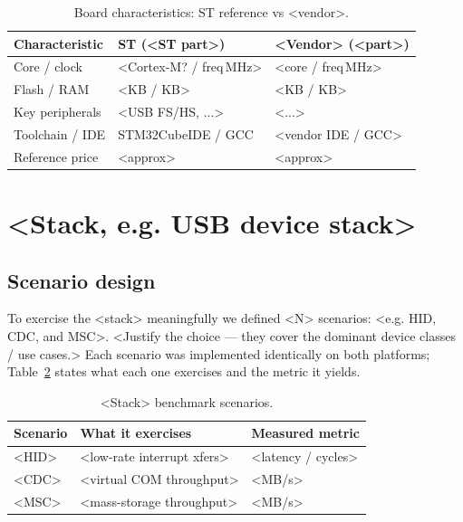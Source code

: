 \begin{table}[H]
  \centering
  \begin{tabular}{l l l}
    \toprule
    Characteristic   & ST (<ST part>)            & <Vendor> (<part>) \\
    \midrule
    Core / clock     & <Cortex-M? / freq\,MHz>   & <core / freq\,MHz> \\
    Flash / RAM      & <KB / KB>                 & <KB / KB> \\
    Key peripherals  & <USB FS/HS, ...>          & <...> \\
    Toolchain / IDE  & STM32CubeIDE / GCC        & <vendor IDE / GCC> \\
    Reference price  & <approx>                  & <approx> \\
    \bottomrule
  \end{tabular}
  \caption{Board characteristics: ST reference vs <vendor>.}
  \label{tab:<vendor-key>-boards}
\end{table}

\section{<Stack, e.g. USB device stack>}
\label{sec:<vendor-key>-<stack-key>}

\subsection{Scenario design}
\label{sec:<vendor-key>-<stack-key>-scenarios}
To exercise the <stack> meaningfully we defined <N> scenarios:
<e.g. HID, CDC, and MSC>. <Justify the choice --- they cover the dominant
device classes / use cases.> Each scenario was implemented identically on
both platforms; Table~\ref{tab:<vendor-key>-<stack-key>-scenarios} states
what each one exercises and the metric it yields.

\begin{table}[H]
  \centering
  \begin{tabular}{l l l}
    \toprule
    Scenario & What it exercises          & Measured metric \\
    \midrule
    <HID>    & <low-rate interrupt xfers> & <latency / cycles> \\
    <CDC>    & <virtual COM throughput>   & <MB/s> \\
    <MSC>    & <mass-storage throughput>  & <MB/s> \\
    \bottomrule
  \end{tabular}
  \caption{<Stack> benchmark scenarios.}
  \label{tab:<vendor-key>-<stack-key>-scenarios}
\end{table}

